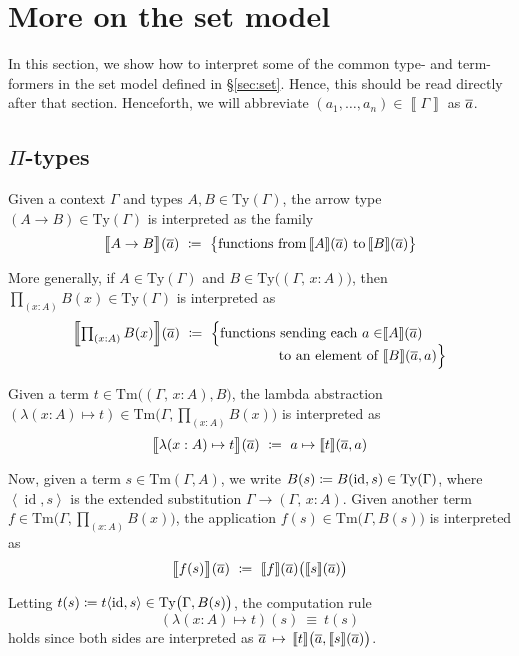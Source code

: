 \documentclass{article}
\theoremstyle{definition}
\renewcommand{\int}[1]{\mathopen{}\left\llbracket #1
    \right\rrbracket\mathclose{}}       %
\newcommand{\Pii}[2]{\textstyle\prod_{#1} #2}             %
\newcommand{\lam}[2]{\lambda #1 \mapsto #2}
\newcommand{\substType}[2]{#2#1}%
\newcommand{\substTerm}[2]{#2#1}%
\newcommand{\extsub}[2]{\ang{#1,#2}}
\newcommand{\Ty}{\mathrm{Ty}}
\newcommand{\Tm}{\mathrm{Tm}}
\DeclareMathOperator{\id}{id}				    %
\newcommand{\defeq}{
	\mathrel{\mathrel{\mathop:}\mkern-1.2mu=}}	%
\newcommand{\tup}[1]{\overline{\smash{#1}\vphantom{a}}}
\newcommand{\ang}[1]{\mathopen{}\left\langle #1 \right\rangle\mathclose{}}
\newcommand{\n}{%
}                %
\begin{document}
\appendix

\section{More on the set model}
\label{app:set}

In this section, we show how to interpret some of the common type- and term-formers in the set model defined in \S\ref{sec:set}. Hence, this should be read directly after that section. Henceforth, we will abbreviate $(a_1,\ldots,a_n) \in \int{\Gamma}$ as $\tup{a}$.


\subsection{\texorpdfstring{$\Pi$}{Pi}-types}

Given a context $\Gamma$ and types $A, B \in \Ty(\Gamma)$, the arrow type $(A \to B) \in \Ty(\Gamma)$ is interpreted as the family
$$\int{\big.A \to B}\n(\tup{a})\ \defeq\ \big\{ \text{functions from}\, \int{A}\n(\tup{a}) \text{ to}\, \int{B}\n(\tup{a}) \big\} $$

More generally, if $A \in \Ty(\Gamma)$ and $B \in \Ty \big( (\Gamma,\, x:A) \big)$, then $\Pii{(x:A)}{B(x)}\in \Ty(\Gamma)$ is interpreted as
\begin{align*}
    \int{\Pii{(x:A)}{B(x)}}(\tup{a})\ \defeq\ \Big\{ \text{functions sending each } a \in &\int{A}\n(\tup{a}) \\[-2mm]
    \text{ to an element of } &\int{B}\n(\tup{a},a) \Big\}
\end{align*}

Given a term $t \in \Tm \big( (\Gamma,\, x:A), B \big)$, the lambda abstraction $(\lam{(x:A)}{t}) \in \Tm\big( \Gamma, \Pii{(x:A)}{B(x)} \big)$ is interpreted as
$$\int{\big.\lam{(x:A)}{t}}\n(\tup{a})\ \defeq\ a %
\mapsto \int{t}\n(\tup{a},a)$$

Now, given a term $s \in \Tm(\Gamma, A)$, we write $B(s) \defeq \substType{(\id,s)}{B} \in \Ty(\Gamma)$, where $\extsub{\id}{s}$ is the extended substitution $\Gamma \to (\Gamma,\, x:A)$. Given another term $f \in \Tm\big( \Gamma, \Pii{(x:A)}{B(x)} \big)$, the application $f(s) \in \Tm\big(\Gamma,B(s) \big)$ is interpreted as
$$\int{\big.f(s)
}\n(\tup{a})\ \defeq\ \int{f}\n(\tup{a}) \big( \int{s}\n(\tup{a}) \big)$$

Letting $t(s) \defeq \substTerm{\extsub{\id}{s}}{t} \in \Ty\big(\Gamma,B(s)\big)$, the computation rule $$(\lam{(x:A)}{t})(s)\ \equiv\ t(s)$$ holds since both sides are interpreted as $\tup{a}\, \mapsto\, \int{t}\n\big(\tup{a}, \int{s}\n(\tup{a}) \big)$.
\end{document}

